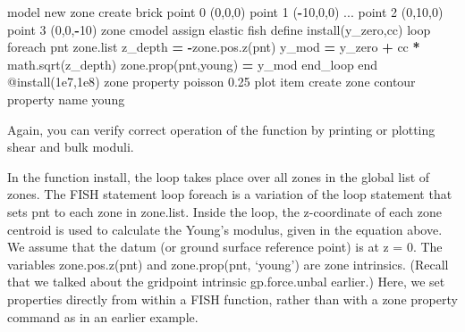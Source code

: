 \documentclass[a4paper, nobind]{templates/ociamthesis}
\newenvironment{Shaded}{\begin{snugshade}}{\end{snugshade}}
\newcommand{\AttributeTok}[1]{\textcolor[rgb]{0.77,0.63,0.00}{#1}}
\newcommand{\BuiltInTok}[1]{#1}
\newcommand{\DecValTok}[1]{\textcolor[rgb]{0.00,0.00,0.81}{#1}}
\newcommand{\FloatTok}[1]{\textcolor[rgb]{0.00,0.00,0.81}{#1}}
\newcommand{\NormalTok}[1]{#1}
\newcommand{\OperatorTok}[1]{\textcolor[rgb]{0.81,0.36,0.00}{\textbf{#1}}}
\newcommand{\StringTok}[1]{\textcolor[rgb]{0.31,0.60,0.02}{#1}}
\renewenvironment{Shaded}
{
  \vspace{10pt}%
  \begin{snugshade}%
}{%
  \end{snugshade}%
  \vspace{8pt}%
}
\begin{document}
\begin{Shaded}
\begin{Highlighting}[]
\NormalTok{model new}
\NormalTok{zone create brick point }\DecValTok{0}\NormalTok{ (}\DecValTok{0}\NormalTok{,}\DecValTok{0}\NormalTok{,}\DecValTok{0}\NormalTok{) point }\DecValTok{1}\NormalTok{ (}\OperatorTok{{-}}\DecValTok{10}\NormalTok{,}\DecValTok{0}\NormalTok{,}\DecValTok{0}\NormalTok{) ...}
\NormalTok{                  point }\DecValTok{2}\NormalTok{ (}\DecValTok{0}\NormalTok{,}\DecValTok{10}\NormalTok{,}\DecValTok{0}\NormalTok{) point }\DecValTok{3}\NormalTok{ (}\DecValTok{0}\NormalTok{,}\DecValTok{0}\NormalTok{,}\OperatorTok{{-}}\DecValTok{10}\NormalTok{)}
\NormalTok{zone cmodel assign elastic}
\NormalTok{fish define install(y\_zero,cc)}
\NormalTok{    loop foreach pnt zone.}\BuiltInTok{list}
\NormalTok{        z\_depth }\OperatorTok{=} \OperatorTok{{-}}\NormalTok{zone.pos.z(pnt)}
\NormalTok{        y\_mod }\OperatorTok{=}\NormalTok{ y\_zero }\OperatorTok{+}\NormalTok{ cc }\OperatorTok{*}\NormalTok{ math.sqrt(z\_depth)}
\NormalTok{        zone.prop(pnt,}\StringTok{\textquotesingle{}young\textquotesingle{}}\NormalTok{) }\OperatorTok{=}\NormalTok{ y\_mod}
\NormalTok{    end\_loop}
\NormalTok{end}
\AttributeTok{@install}\NormalTok{(}\FloatTok{1e7}\NormalTok{,}\FloatTok{1e8}\NormalTok{)}
\NormalTok{zone }\BuiltInTok{property}\NormalTok{ poisson }\FloatTok{0.25}
\NormalTok{plot item create zone contour }\BuiltInTok{property}\NormalTok{ name }\StringTok{\textquotesingle{}young\textquotesingle{}}
\end{Highlighting}
\end{Shaded}

Again, you can verify correct operation of the function by printing or plotting shear and bulk moduli.

In the function install, the loop takes place over all zones in the global list of zones. The FISH statement loop foreach is a variation of the loop statement that sets pnt to each zone in zone.list. Inside the loop, the z-coordinate of each zone centroid is used to calculate the Young's modulus, given in the equation above. We assume that the datum (or ground surface reference point) is at z = 0. The variables zone.pos.z(pnt) and zone.prop(pnt, `young') are zone intrinsics. (Recall that we talked about the gridpoint intrinsic gp.force.unbal earlier.) Here, we set properties directly from within a FISH function, rather than with a zone property command as in an earlier example.
\end{document}
